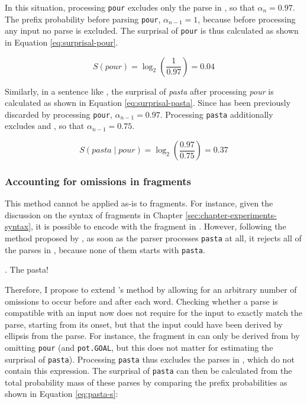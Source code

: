 In this situation, processing \texttt{pour} excludes only the parse in \Last[c], so that $\alpha_{n} = 0.97$. The prefix probability before parsing \texttt{pour}, $\alpha_{n-1} = 1$, because before processing any input no parse is excluded. The surprisal of \texttt{pour} is thus calculated as shown in Equation \ref{eq:surprisal-pour}.

\begin{equation}
 \displaystyle S(pour) = \log_2(\frac{1}{0.97}) = 0.04 \label{eq:surprisal-pour}
\end{equation}

Similarly, in a sentence like \Last[a], the surprisal of \textit{pasta} after processing \textit{pour} is calculated as shown in Equation \ref{eq:surprisal-pasta}. Since \Last[c] has been previously discarded by processing \texttt{pour}, $\alpha_{n-1} = 0.97$. Processing \texttt{pasta} additionally excludes \Last[b] and \Last[d], so that $\alpha_{n-1} = 0.75$.

\begin{equation}
 \displaystyle S(pasta\mathbin{|}pour) = \log_2(\frac{0.97}{0.75}) = 0.37 \label{eq:surprisal-pasta}
\end{equation}

\subsubsection{Accounting for omissions in fragments}     

This method cannot be applied as-is to fragments. For instance, given the discussion on the syntax of fragments in Chapter \ref{sec:chapter-experiments-syntax}, it is possible to encode \Last[a] with the fragment in \Next. However, following the method proposed by \citet{hale2001}, as soon as the parser processes \texttt{pasta} at all, it rejects all of the parses in \Last, because none of them starts with \texttt{pasta}. 

\ex. The pasta!

Therefore, I propose to extend \citeauthor{hale2001}'s method by allowing for an arbitrary number of omissions to occur before and after each word. Checking whether a parse is compatible with an input now does not require for the input to exactly match the parse, starting from its onset, but that the input could have been derived by ellipsis from the parse. For instance, the fragment in \Last can only be derived from \LLast[a] by omitting \texttt{pour} (and \texttt{pot.GOAL}, but this does not matter for estimating the surprisal of \texttt{pasta}). Processing \texttt{pasta} thus excludes the parses in \LLast[b-d], which do not contain this expression. The surprisal of \texttt{pasta} can then be calculated from the total probability mass of these parses by comparing the prefix probabilities as shown in Equation \ref{eq:pasta-s}:

